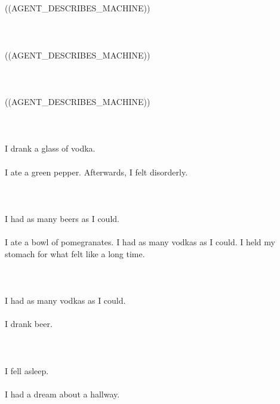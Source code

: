 \documentclass{article}
\begin{document}
    \newpage
    
    \section{}
    ((AGENT_DESCRIBES_MACHINE))\\\\ 
    \newpage
    
    \section{}
    ((AGENT_DESCRIBES_MACHINE))\\\\ 
    \newpage
    
    \section{}
    ((AGENT_DESCRIBES_MACHINE))\\\\ 
    \newpage
    
    \section{}
    I drank a glass of vodka.\\\\I ate a green pepper. Afterwards, I felt disorderly.\\\\ 
    \newpage
    
    \section{}
    I had as many beers as I could.\\\\I ate a bowl of pomegranates. I had as many vodkas as I could. I held my stomach for what felt like a long time.\\\\ 
    \newpage
    
    \section{}
    I had as many vodkas as I could.\\\\I drank beer.\\\\ 
    \newpage
    
    \section{}
    I fell asleep.\\\\I had a dream about a hallway.\\\\ 
    \newpage
    
    
\end{document}
